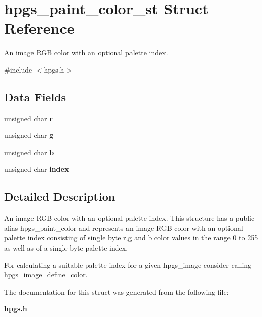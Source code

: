 \section{hpgs\_\-paint\_\-color\_\-st Struct Reference}
\label{structhpgs__paint__color__st}


An image RGB color with an optional palette index.  




{\ttfamily \#include $<$hpgs.h$>$}

\subsection*{Data Fields}
\begin{DoxyCompactItemize}
\item 
unsigned char {\bfseries r}\label{structhpgs__paint__color__st_a12daa9c92a80e567247c59451d8fe4f1}

\item 
unsigned char {\bfseries g}\label{structhpgs__paint__color__st_adef6a2ae2a146ecea42cfad60c276a9b}

\item 
unsigned char {\bfseries b}\label{structhpgs__paint__color__st_a154b2f2f04b37f774bc731d837161a27}

\item 
unsigned char {\bfseries index}\label{structhpgs__paint__color__st_a7335459b625a2c15af167e518eac9fe4}

\end{DoxyCompactItemize}


\subsection{Detailed Description}
An image RGB color with an optional palette index. This structure has a public alias {\ttfamily hpgs\_\-paint\_\-color} and represents an image RGB color with an optional palette index consisting of single byte r,g and b color values in the range 0 to 255 as well as of a single byte palette index.

For calculating a suitable palette index for a given {\ttfamily hpgs\_\-image} consider calling {\ttfamily hpgs\_\-image\_\-define\_\-color}. 

The documentation for this struct was generated from the following file:\begin{DoxyCompactItemize}
\item 
{\bf hpgs.h}\end{DoxyCompactItemize}
